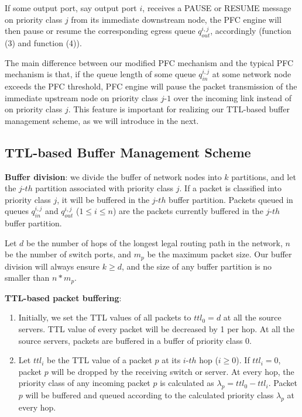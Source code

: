 If some output port, say output port $i$, receives a PAUSE or RESUME message on priority class $j$ from its immediate downstream node, the PFC engine will then pause or resume the corresponding egress queue $q_{out}^{i,j}$, accordingly (function (3) and function (4)).

The main difference between our modified PFC mechanism and the typical PFC mechanism is that, if the queue length of some queue $q_{in}^{i,j}$ at some network node exceeds the PFC threshold, PFC engine will pause the packet transmission of the immediate upstream node on priority class $j$-$1$ over the incoming link instead of on priority class $j$. This feature is important for realizing our TTL-based buffer management scheme, as we will introduce in the next.


\subsection{TTL-based Buffer Management Scheme}\label{subsec:ttlscheme}

\textbf{Buffer division}: we divide the buffer of network nodes into $k$ partitions, and let the $j$-$th$ partition associated with priority class $j$. If a packet is classified into priority class $j$, it will  be buffered in the $j$-$th$ buffer partition. Packets queued in queues $q_{in}^{i,j}$ and $q_{out}^{i,j}$ ($1\leq i \leq n$) are the packets currently buffered in the $j$-$th$ buffer partition.

Let $d$ be the number of hops of the longest legal routing path in the network, $n$ be the number of switch ports, and $m_{p}$ be the maximum packet size. Our buffer division will always ensure $k \geq d$, and the size of any buffer partition is no smaller than $n*m_{p}$. 

\textbf{TTL-based packet buffering}: 
\begin{enumerate}
	\item  Initially, we set the TTL values of all packets to $ttl_0=d$ at all the source servers. TTL value of every packet will be decreased by 1 per hop. At all the source servers, packets are buffered in a buffer of priority class $0$.
	
	\item Let $ttl_i$ be the TTL value of a packet $p$ at its $i$-$th$ hop ($i \geq 0$). If $ttl_i = 0$, packet $p$ will be dropped by the receiving switch or server. At every hop, the priority class of any incoming packet $p$ is calculated as $\lambda_p = ttl_0 - ttl_i $. Packet $p$ will be buffered and queued according to the calculated priority class $\lambda_p$ at every hop.
\end{enumerate}


